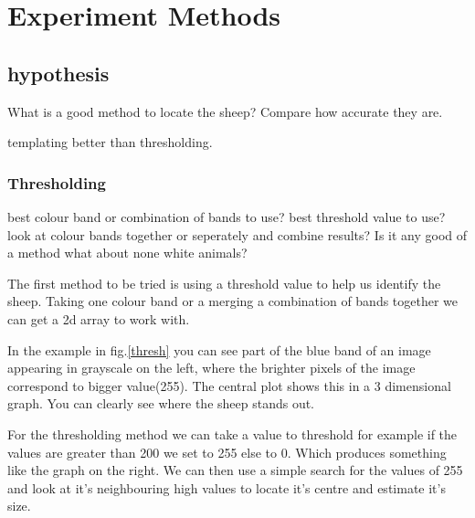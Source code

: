 \chapter{Experiment Methods}
\begin{comment}
This section should discuss the overall hypothesis being tested and justify the approach selected in the context of the research area.  Describe the experiment design that has been selected and how measurements and comparisons of results are to be made. 

You should concentrate on the more important aspects of the method. Present an overview before going into detail. As well as describing the methods adopted, discuss other approaches that were considered. You might also discuss areas that you had to revise after some investigation. 


\end{comment}

\section{hypothesis}

What is a good method to locate the sheep?
Compare how accurate they are.

templating better than thresholding.

\subsection{Thresholding}

best colour band or combination of bands to use?
best threshold value to use?
look at colour bands together or seperately and combine results? Is it any good of a method what about none white animals?

The first method to be tried is using a threshold value to help us identify the sheep\cite{opencv-t}. Taking one colour band or a merging a combination of bands together we can get a 2d array to work with. 
    
    In the example in fig.\ref{thresh} you can see part of the blue band of an image appearing in grayscale on the left, where the brighter pixels of the image correspond to bigger value(255). The central plot shows this in a 3 dimensional graph. You can clearly see where the sheep stands out. 
    
    For the thresholding method we can take a value to threshold for example if the values are greater than 200 we set to 255 else to 0. Which produces something like the graph on the right. We can then use a simple search for the values of 255 and look at it's neighbouring high values to locate it's centre and estimate it's size.
    
